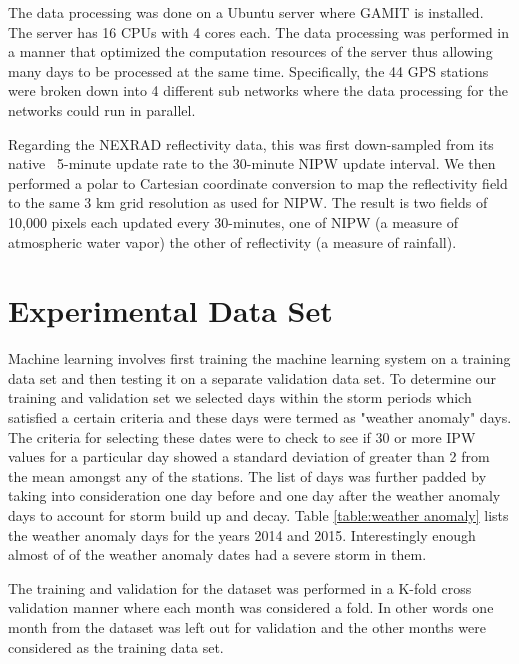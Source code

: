 \documentclass[proposal]{umassthesis}
\begin{document}
The data processing was done on a Ubuntu server where GAMIT is installed. The server has 16 CPUs with 4 cores each. The data processing was performed in a manner that optimized the computation resources of the server thus allowing many days to be processed at the same time. Specifically, the 44 GPS stations were broken down into 4 different sub networks where the data processing for the networks could run in parallel.

Regarding the NEXRAD reflectivity data, this was first down-sampled from its native ~5-minute update rate to the 30-minute NIPW update interval. We then performed a polar to Cartesian coordinate conversion to map the reflectivity field to the same 3 km grid resolution as used for NIPW. The result is two fields of 10,000 pixels each updated every 30-minutes, one of NIPW (a measure of atmospheric water vapor) the other of reflectivity (a measure of rainfall).

\section{Experimental Data Set}

Machine learning involves first training the machine learning system on a training data set and then testing it on a separate validation data set. To determine our training and validation set we selected days within the storm periods which satisfied a certain criteria and these days were termed as "weather anomaly" days. The criteria for selecting these dates were to check to see if 30 or more IPW values for a particular day showed a standard deviation of greater than 2 from the mean amongst any of the stations. The list of days was further padded by taking into consideration one day before and one day after the weather anomaly days to account for storm build up and decay. Table \ref{table:weather anomaly} lists the weather anomaly days for the years 2014 and 2015. Interestingly enough almost of of the weather anomaly dates had a severe storm in them. 

The training and validation for the dataset was performed in a K-fold cross validation manner where each month was considered a fold. In other words one month from the dataset was left out for validation and the other months were considered as the training data set. 
\end{document}
